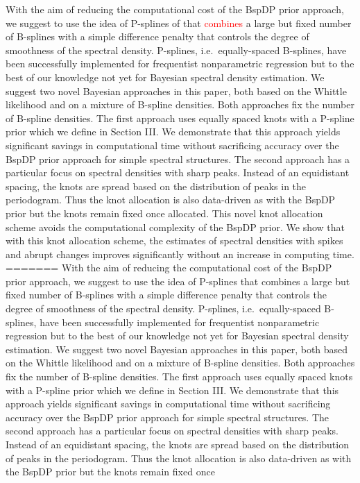 \documentclass[twocolumn,final]{svjour3}
\begin{document}

With the aim of reducing the computational cost of the BspDP prior approach,  we suggest to use the idea of P-splines of \cite{Eilers:1996} that \textcolor{red}{combines} a large but fixed number of  B-splines with a simple difference penalty that controls the degree of  smoothness of the spectral density. P-splines, i.e.\  equally-spaced B-splines,  have been successfully implemented for frequentist nonparametric regression but to the best of our knowledge not yet for Bayesian spectral density estimation. We suggest two novel Bayesian  approaches in this paper, both based on the Whittle likelihood and on a mixture of B-spline densities. Both approaches fix the  number of B-spline densities.  The first approach uses equally spaced knots with a P-spline prior which we define in Section III. We demonstrate that this approach yields significant savings in computational time without sacrificing accuracy over the BspDP prior approach for simple spectral structures.  The second approach has a particular  focus on spectral densities with sharp peaks. Instead of an equidistant spacing, the knots are spread based on the distribution of peaks in the periodogram. Thus the knot allocation is also data-driven as with the BspDP prior but the knots  remain fixed once allocated. This novel knot allocation scheme avoids the computational complexity of the BspDP prior.  We show that with this knot allocation scheme, the estimates of spectral densities with spikes and abrupt changes improves significantly without an increase in computing time.
=======
With the aim of reducing the computational cost of the BspDP prior approach,  we suggest to use the idea of P-splines \cite{Eilers:1996} that combines a large but fixed number of  B-splines with a simple difference penalty that controls the degree of  smoothness of the spectral density. P-splines, i.e.\  equally-spaced B-splines,  have been successfully implemented for frequentist nonparametric regression but to the best of our knowledge not yet for Bayesian spectral density estimation. We suggest 
two novel Bayesian  approaches in this paper, both based on the Whittle likelihood and on a mixture of B-spline densities. Both approaches fix the  number of B-spline densities. 
The first approach uses equally spaced knots with a P-spline prior which we define in Section III. We demonstrate that this approach yields significant savings in computational time without sacrificing accuracy over the BspDP prior approach for simple spectral structures.  The second approach has a particular  focus on spectral densities with sharp peaks. Instead of an equidistant spacing, the knots are spread based on the distribution of peaks in the periodogram. Thus the knot allocation is also data-driven as with the BspDP prior but the knots  remain fixed once
\end{document}

